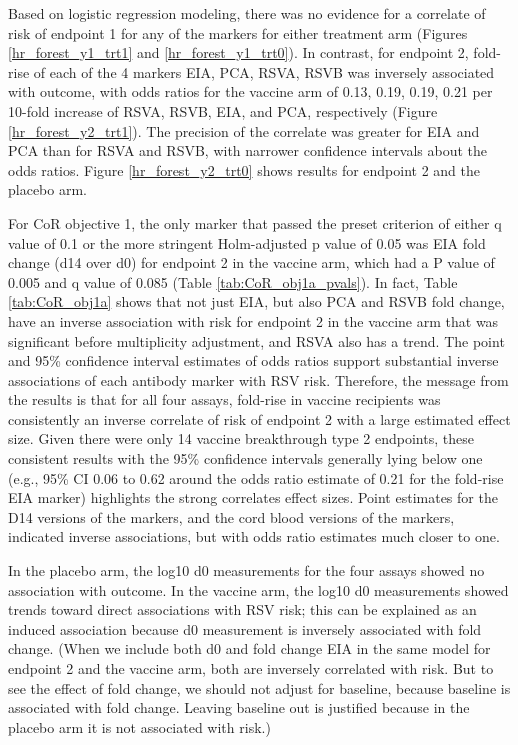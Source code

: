 \documentclass[11pt]{article}
\begin{document}
Based on logistic regression modeling, there was no evidence for a correlate of risk of endpoint 1 for any of the markers for either treatment arm
(Figures \ref{hr_forest_y1_trt1} and \ref{hr_forest_y1_trt0}).
In contrast, for endpoint 2, fold-rise of each of the 4 markers EIA, PCA, RSVA, RSVB was inversely associated with outcome,
with odds ratios for the vaccine arm of 0.13, 0.19, 0.19, 0.21 per 10-fold increase of RSVA, RSVB, EIA, and PCA, respectively
(Figure \ref{hr_forest_y2_trt1}). The precision of the correlate was greater for EIA and PCA than for RSVA and RSVB, with narrower confidence intervals about the odds ratios. Figure
\ref{hr_forest_y2_trt0} shows results for endpoint 2 and the placebo arm.

For CoR objective 1, the only marker that passed the preset criterion of either q value of 0.1 or the more stringent Holm-adjusted p value of 0.05 was EIA fold change (d14 over d0) for endpoint 2 in the vaccine arm, which had a P value of 0.005 and q value of 0.085 (Table \ref{tab:CoR_obj1a_pvals}). In fact, Table \ref{tab:CoR_obj1a} shows that not just EIA, but also PCA and RSVB fold change, have an inverse association with risk for endpoint 2 in the vaccine arm that was significant before multiplicity adjustment, and RSVA also has a trend. The point and 95\% confidence interval estimates of odds ratios support substantial inverse associations of each antibody marker with RSV risk. Therefore, the message from the results is that for all four assays, fold-rise in vaccine recipients was consistently an inverse correlate of risk of endpoint 2 with a large estimated effect size. Given there were only 14 vaccine breakthrough type 2 endpoints, these consistent results with the 95\% confidence intervals generally lying below one (e.g., 95\% CI 0.06 to 0.62 around the odds ratio estimate of 0.21 for the fold-rise EIA marker) highlights the strong correlates effect sizes. Point estimates for the D14 versions of the markers, and the cord blood versions of the markers, indicated inverse associations, but with odds ratio estimates much closer to one.

\bigskip

In the placebo arm, the log10 d0 measurements for the four assays showed no association with outcome. In the vaccine arm, the log10 d0 measurements showed trends toward direct associations with RSV risk; this can be explained as an induced association because d0 measurement is inversely associated with fold change. (When we include both d0 and fold change EIA in the same model for endpoint 2 and the vaccine arm, both are inversely correlated with risk. But to see the effect of fold change, we should not adjust for baseline, because baseline is associated with fold change. Leaving baseline out is justified because in the placebo arm it is not associated with risk.)
\bigskip
\end{document}
